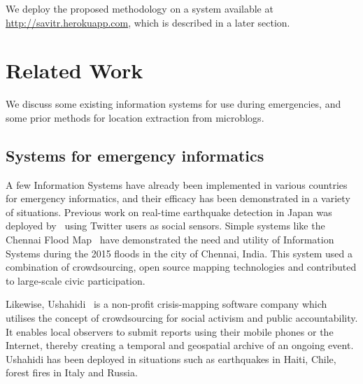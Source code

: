 We deploy the proposed methodology on a system available at \url{http://savitr.herokuapp.com}, which is described in a later section.

\section{Related Work}

We discuss some existing information systems for use during emergencies, and some prior methods for location extraction from microblogs.

\subsection{Systems for emergency informatics}

A few Information Systems have already been implemented in various countries for emergency informatics, and their efficacy has been demonstrated in a variety of situations. 
Previous work on real-time earthquake detection in Japan was deployed by~\cite{Sakaki} using Twitter users as social sensors. 
Simple systems like the Chennai Flood Map~\cite{Mapbox} have demonstrated the need and utility of Information Systems during the 2015 floods in the city of Chennai, India.
This system used a combination of crowdsourcing, open source mapping technologies and contributed to large-scale civic participation.

Likewise, Ushahidi~\cite{Ushahidi} is a non-profit crisis-mapping software
company which utilises the concept of crowdsourcing for social
activism and public accountability. It enables local observers to submit reports using their mobile phones or the Internet, thereby creating a temporal and geospatial archive of an ongoing event. 
Ushahidi has been deployed in situations such as earthquakes in Haiti, Chile, forest fires in Italy and Russia.


